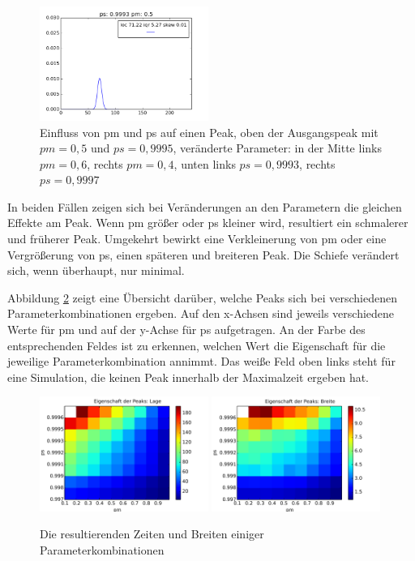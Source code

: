 \begin{figure}[h]
\includegraphics[width=0.49\textwidth]{bilder/2s_t100_psm}
\caption[Einfluss von pm und ps auf einen Peak]{Einfluss von pm und ps auf einen Peak, oben der Ausgangspeak mit $pm = 0,5$ und $ps = 0,9995$, veränderte Parameter: in der Mitte links $pm = 0,6$, rechts $pm = 0,4$, unten links $ps = 0,9993$, rechts $ps = 0,9997$ }
\label{2s_t100_change}
\end{figure}

In beiden Fällen zeigen sich bei Veränderungen an den Parametern die gleichen Effekte am Peak. Wenn pm größer oder ps kleiner wird, resultiert ein schmalerer und früherer Peak. Umgekehrt bewirkt eine Verkleinerung von pm oder eine Vergrößerung von ps, einen späteren und breiteren Peak. Die Schiefe verändert sich, wenn überhaupt, nur minimal.

Abbildung \ref{heatmap_lage_breite} zeigt eine Übersicht darüber, welche Peaks sich bei verschiedenen Parameterkombinationen ergeben. Auf den x-Achsen sind jeweils verschiedene Werte für pm und auf der y-Achse für ps aufgetragen. An der Farbe des entsprechenden Feldes ist zu erkennen, welchen Wert die Eigenschaft für die jeweilige Parameterkombination annimmt. Das weiße Feld oben links steht für eine Simulation, die keinen Peak innerhalb der Maximalzeit ergeben hat.

\begin{figure}[h]
\includegraphics[width=0.49\textwidth]{bilder/erreichbare_Zeiten_2s}
\includegraphics[width=0.49\textwidth]{bilder/erreichbare_Breiten_2s}
\caption{Die resultierenden Zeiten und Breiten einiger Parameterkombinationen}
\label{heatmap_lage_breite}
\end{figure}

